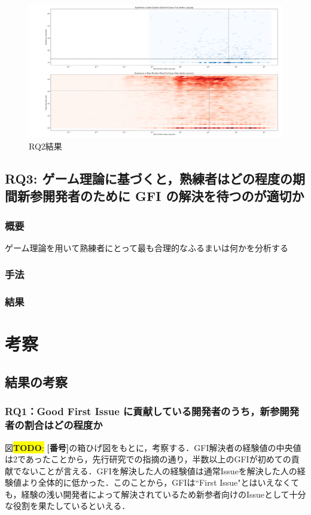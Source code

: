 \documentclass[11pt]{jreport}
\newcommand{\RQThree}{ゲーム理論に基づくと，熟練者はどの程度の期間新参開発者のために GFI の解決を待つのが適切か}
\newcommand{\todo}[1]{\colorbox{yellow}{{\bf TODO}:}{\color{red} {\textbf{[#1]}}}}
\begin{document}
\begin{figure}[t]
\centerline{\includegraphics[width=0.9\linewidth]{@BSthesis2024_Nakai/BSthesis2024_Nakai_fig/hexbin.png}}
\caption{RQ2結果}
\label{fig:milestone}
\end{figure}

\section{RQ3: \RQThree}

\subsection{概要}

ゲーム理論を用いて熟練者にとって最も合理的なふるまいは何かを分析する 

\subsection{手法}

\subsection{結果}

\chapter{考察}

\section{結果の考察}

\subsection{RQ1：Good First Issue に貢献している開発者のうち，新参開発者の割合はどの程度か }
図\todo{番号}の箱ひげ図をもとに，考察する．GFI解決者の経験値の中央値は2であったことから，先行研究\cite{GFI_half}での指摘の通り，半数以上のGFIが初めての貢献でないことが言える．GFIを解決した人の経験値は通常Issueを解決した人の経験値より全体的に低かった．このことから，GFIは``First Issue"とはいえなくても，経験の浅い開発者によって解決されているため新参者向けのIssueとして十分な役割を果たしているといえる．
\end{document}
